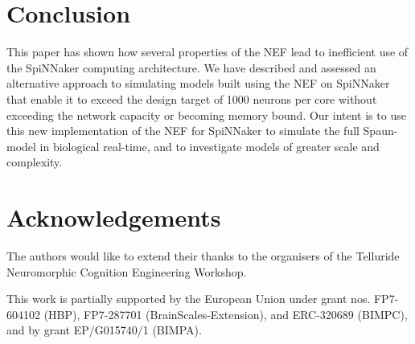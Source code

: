 \documentclass[conference]{IEEEtran}
\newcommand{\funding}{%
  This work is partially supported by the European Union under grant nos. FP7-604102 (HBP), FP7-287701 (BrainScales-Extension), and ERC-320689 (BIMPC), and by grant EP/G015740/1 (BIMPA).
}
\begin{document}
  \section{Conclusion}

  This paper has shown how several properties of the NEF lead to inefficient use of the SpiNNaker computing architecture.
  We have described and assessed an alternative approach to simulating models built using the NEF on SpiNNaker that enable it to exceed the design target of 1000 neurons per core without exceeding the network capacity or becoming memory bound.
  Our intent is to use this new implementation of the NEF for SpiNNaker to simulate the full Spaun-model in biological real-time, and to investigate models of greater scale and complexity.

  \section*{Acknowledgements}

The authors would like to extend their thanks to the organisers of the Telluride Neuromorphic Cognition Engineering Workshop.

  \funding

  \printbibliography
\end{document}
